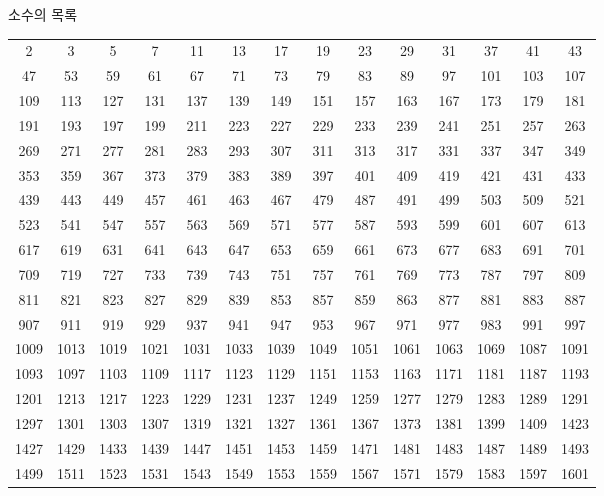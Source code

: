\documentclass[10pt, a4paper]{article}
\begin{document}
\begin{center}
    \huge{소수의 목록}\normalsize\\
    \begin{longtable}{c c c c c c c c c c c c c c}
        \hline
        2 & 3 & 5 & 7 & 11 & 13 & 17 & 19 & 23 & 29 & 31 & 37 & 41 & 43 \\
        47 & 53 & 59 & 61 & 67 & 71 & 73 & 79 & 83 & 89 & 97 & 101 & 103 & 107 \\
        109 & 113 & 127 & 131 & 137 & 139 & 149 & 151 & 157 & 163 & 167 & 173 & 179 & 181 \\
        191 & 193 & 197 & 199 & 211 & 223 & 227 & 229 & 233 & 239 & 241 & 251 & 257 & 263 \\
        269 & 271 & 277 & 281 & 283 & 293 & 307 & 311 & 313 & 317 & 331 & 337 & 347 & 349 \\
        353 & 359 & 367 & 373 & 379 & 383 & 389 & 397 & 401 & 409 & 419 & 421 & 431 & 433 \\
        439 & 443 & 449 & 457 & 461 & 463 & 467 & 479 & 487 & 491 & 499 & 503 & 509 & 521 \\
        523 & 541 & 547 & 557 & 563 & 569 & 571 & 577 & 587 & 593 & 599 & 601 & 607 & 613 \\
        617 & 619 & 631 & 641 & 643 & 647 & 653 & 659 & 661 & 673 & 677 & 683 & 691 & 701 \\
        709 & 719 & 727 & 733 & 739 & 743 & 751 & 757 & 761 & 769 & 773 & 787 & 797 & 809 \\
        \hline
        811 & 821 & 823 & 827 & 829 & 839 & 853 & 857 & 859 & 863 & 877 & 881 & 883 & 887 \\
        907 & 911 & 919 & 929 & 937 & 941 & 947 & 953 & 967 & 971 & 977 & 983 & 991 & 997 \\
        1009 & 1013 & 1019 & 1021 & 1031 & 1033 & 1039 & 1049 & 1051 & 1061 & 1063 & 1069 & 1087 & 1091 \\
        1093 & 1097 & 1103 & 1109 & 1117 & 1123 & 1129 & 1151 & 1153 & 1163 & 1171 & 1181 & 1187 & 1193 \\
        1201 & 1213 & 1217 & 1223 & 1229 & 1231 & 1237 & 1249 & 1259 & 1277 & 1279 & 1283 & 1289 & 1291 \\
        1297 & 1301 & 1303 & 1307 & 1319 & 1321 & 1327 & 1361 & 1367 & 1373 & 1381 & 1399 & 1409 & 1423 \\
        1427 & 1429 & 1433 & 1439 & 1447 & 1451 & 1453 & 1459 & 1471 & 1481 & 1483 & 1487 & 1489 & 1493 \\
        1499 & 1511 & 1523 & 1531 & 1543 & 1549 & 1553 & 1559 & 1567 & 1571 & 1579 & 1583 & 1597 & 1601 \\

\end{longtable}
\end{center}
\end{document}
